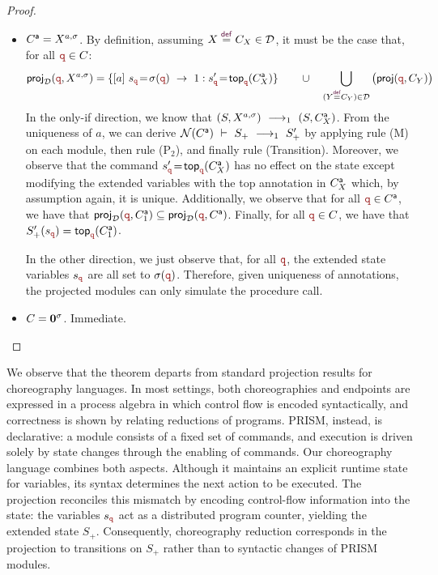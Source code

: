\begin{proof}
\begin{itemize}
    \item ${C}^{\mathsf a}=X^{a,\sigma}$. By definition, assuming
      $X\defrec C_X\in \defin$, it must be the case that, for all
      $\nrr\in C$:
      \[\projD (\nrr, X^{a,\sigma}) = \{
        \commandBase {a} {s_{\nrr}\!=\! \sigma(\nrr)}{\ 1:
          s'_{\nrr}\!=\! } \mathsf{top}_{\nrr}(\anno
        C_X)\}\qquad\cup\quad\bigcup_{(Y\defrec
          C_Y)\in\defin}\big(\proj (\nrr, C_Y)\big)\]
      In the only-if direction, we know that
      $(S, X^{a,\sigma}) \ \longrightarrow_{1}\  (S, {C}^{\mathsf a}_X)$. From the uniqueness
      of $a$, we can derive
      $\mathcal N(\anno C)\ \vdash\ S_+ \red{1}
      S_+'$ by applying rule (\textsf{M}) on each module, then rule
      (\textsf{P$_2$}), and finally rule (\textsf{Transition}).
      Moreover, we observe that the command
      $s'_{\nrr}\!=\!  \mathsf{top}_{\nrr}(\anno C_X)$ has no effect
      on the state except modifying the extended variables with the
      top annotation in ${C}^{\mathsf a}_X$ which, by assumption again, it is
      unique. Additionally, we observe that for all $\nrr\in \anno C$,
      we have that
      $\projD(\nrr, \anno C_1) \subseteq \projD(\nrr, \anno
      C)$. Finally, for all $\nrr\in C$, we have that
      $S_+'(s_{\nrr}) = \topannotation\nrr {\anno C_1}$.

      In the other direction, we just observe that, for all $\nrr$,
      the extended state variables $s_{\nrr}$ are all set to
      $\sigma(\nrr)$. Therefore, given uniqueness of annotations, the
      projected modules can only simulate the procedure call.


    \item $C=\mathbf{0}^\sigma$. Immediate.\qedhere
    
  \end{itemize}
\end{proof}
We observe that the theorem departs from standard projection results
for choreography languages.  In most settings, both choreographies and
endpoints are expressed in a process algebra in which control flow is
encoded syntactically, and correctness is shown by relating reductions
of programs.  PRISM, instead, is declarative: a module consists of a
fixed set of commands, and execution is driven solely by state changes
through the enabling of commands.
Our choreography language combines both aspects.  Although it
maintains an explicit runtime state for variables, its syntax
determines the next action to be executed.  The projection reconciles
this mismatch by encoding control-flow information into the state: the
variables $s_{\nrr}$ act as a distributed program counter, yielding
the extended state $S_+$.
Consequently, choreography reduction corresponds in the projection to
transitions on $S_+$ rather than to syntactic changes of PRISM
modules.


